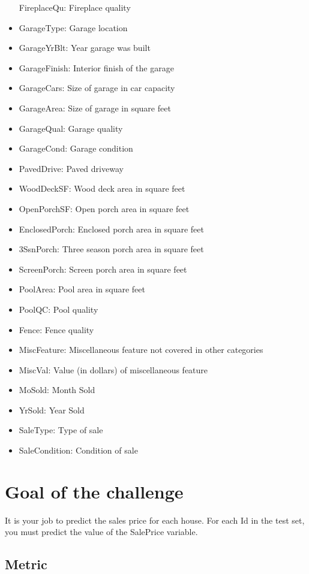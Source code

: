 \documentclass[11pt]{article}
\begin{document}
\begin{itemize}
  FireplaceQu: Fireplace quality
\item
  GarageType: Garage location
\item
  GarageYrBlt: Year garage was built
\item
  GarageFinish: Interior finish of the garage
\item
  GarageCars: Size of garage in car capacity
\item
  GarageArea: Size of garage in square feet
\item
  GarageQual: Garage quality
\item
  GarageCond: Garage condition
\item
  PavedDrive: Paved driveway
\item
  WoodDeckSF: Wood deck area in square feet
\item
  OpenPorchSF: Open porch area in square feet
\item
  EnclosedPorch: Enclosed porch area in square feet
\item
  3SsnPorch: Three season porch area in square feet
\item
  ScreenPorch: Screen porch area in square feet
\item
  PoolArea: Pool area in square feet
\item
  PoolQC: Pool quality
\item
  Fence: Fence quality
\item
  MiscFeature: Miscellaneous feature not covered in other categories
\item
  MiscVal: Value (in dollars) of miscellaneous feature
\item
  MoSold: Month Sold
\item
  YrSold: Year Sold
\item
  SaleType: Type of sale
\item
  SaleCondition: Condition of sale
\end{itemize}

    \section{Goal of the challenge}\label{goal-of-the-challenge}

It is your job to predict the sales price for each house. For each Id in
the test set, you must predict the value of the SalePrice variable.

\subsection{Metric}\label{metric}
\end{document}
